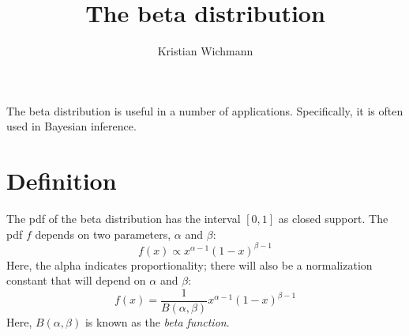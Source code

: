 \documentclass[12pt, a4paper]{article}
\title{The beta distribution}
\author{Kristian Wichmann}
\begin{document}
\maketitle

The beta distribution is useful in a number of applications. Specifically, it is often used in Bayesian inference.

\section{Definition}
The pdf of the beta distribution has the interval $[0,1]$ as closed support. The pdf $f$ depends on two parameters, $\alpha$ and $\beta$:
\begin{equation}
\label{pdf1}
f(x)\propto x^{\alpha-1}(1-x)^{\beta-1}
\end{equation}
Here, the alpha indicates proportionality; there will also be a normalization constant that will depend on $\alpha$ and $\beta$:
\begin{equation}
\label{pdf2}
f(x)=\frac{1}{B(\alpha,\beta)} x^{\alpha-1}(1-x)^{\beta-1}
\end{equation}
Here, $B(\alpha,\beta)$ is known as the \textit{beta function}.
\end{document}
